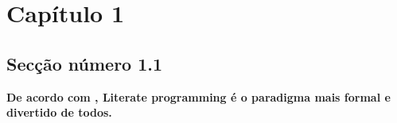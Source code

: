 \documentclass[
12pt,				%
openright,			%
oneside,			%
a4paper,			%
brazil,				%
]{abntex2}
\begin{document}

\chapter{Capítulo 1}
\section{Secção número 1.1}

\textbf{De acordo com \cite{foo}, Literate programming é o paradigma mais formal e divertido de todos.}

\lipsum[1-2] %

\end{document}
